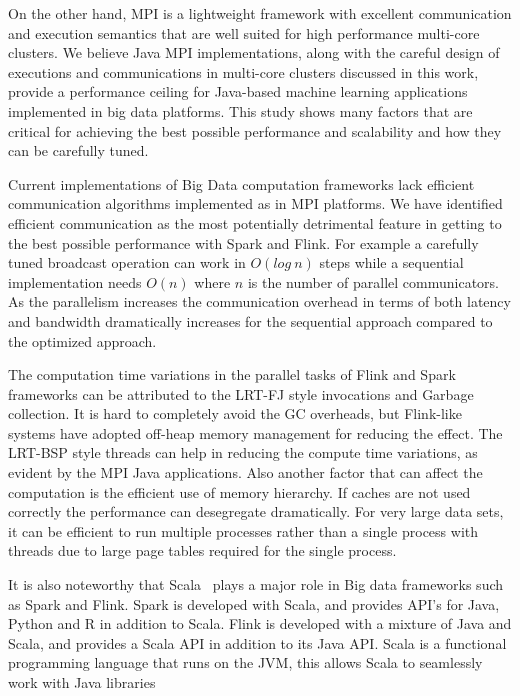 \documentclass[10pt, conference, compsocconf]{IEEEtran}
\begin{document}
On the other hand, MPI is a lightweight framework with excellent communication and execution semantics that are  well suited for high performance multi-core clusters. We believe Java MPI implementations, along with the careful design of executions and communications in multi-core clusters discussed in this work, provide a performance ceiling for Java-based machine learning applications implemented in big data platforms. This study shows many factors that are critical for achieving the best possible performance and scalability and how they can be carefully tuned. 

Current implementations of Big Data computation frameworks lack efficient communication algorithms implemented as in MPI platforms. We have identified efficient communication as the most potentially detrimental feature in getting to the best possible performance with Spark and Flink. For example a carefully tuned broadcast operation can work in $O(log\ n)$ steps while a sequential implementation needs $O(n)$ where $n$ is the number of parallel communicators. As the parallelism increases the communication overhead in terms of both latency and bandwidth dramatically increases for the sequential approach compared to the optimized approach.

The computation time variations in the parallel tasks of Flink and Spark frameworks can be attributed to the \ac{LRT-FJ} style invocations and Garbage collection. It is hard to completely avoid the GC overheads, but Flink-like systems have adopted off-heap memory management for reducing the effect. The \ac{LRT-BSP} style threads can  help in reducing the compute time variations, as evident by the MPI Java applications. Also another factor that can affect the computation is the efficient use of memory hierarchy. If caches are not used correctly the performance can desegregate dramatically. For very large data sets, it can be efficient to run multiple processes rather than a single process with threads due to large page tables required for the single process.   

It is also noteworthy that Scala~\cite{scalalang} plays a major role in Big data frameworks such as Spark and Flink. Spark is developed with Scala, and provides \ac{API}'s for Java, Python and R in addition to Scala. Flink is developed with a mixture of Java and Scala, and provides a Scala \ac{API} in addition to its Java \ac{API}. Scala is a functional programming language that runs on the \ac{JVM}, this allows Scala to seamlessly work with Java libraries
\end{document}
